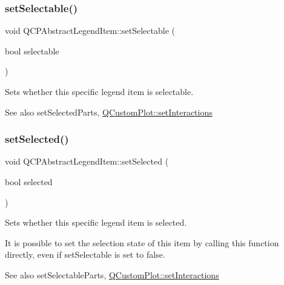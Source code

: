 \subsubsection{\texorpdfstring{set\+Selectable()}{setSelectable()}}
{\footnotesize\ttfamily void Q\+C\+P\+Abstract\+Legend\+Item\+::set\+Selectable (\begin{DoxyParamCaption}\item[{bool}]{selectable }\end{DoxyParamCaption})}

Sets whether this specific legend item is selectable.

\begin{DoxySeeAlso}{See also}
set\+Selected\+Parts, \hyperlink{class_q_custom_plot_a5ee1e2f6ae27419deca53e75907c27e5}{Q\+Custom\+Plot\+::set\+Interactions} 
\end{DoxySeeAlso}
\mbox{\label{class_q_c_p_abstract_legend_item_a6eed93b0ab99cb3eabb043fb08179c2b}} 
\subsubsection{\texorpdfstring{set\+Selected()}{setSelected()}}
{\footnotesize\ttfamily void Q\+C\+P\+Abstract\+Legend\+Item\+::set\+Selected (\begin{DoxyParamCaption}\item[{bool}]{selected }\end{DoxyParamCaption})}

Sets whether this specific legend item is selected.

It is possible to set the selection state of this item by calling this function directly, even if set\+Selectable is set to false.

\begin{DoxySeeAlso}{See also}
set\+Selectable\+Parts, \hyperlink{class_q_custom_plot_a5ee1e2f6ae27419deca53e75907c27e5}{Q\+Custom\+Plot\+::set\+Interactions} 
\end{DoxySeeAlso}
\mbox{\label{class_q_c_p_abstract_legend_item_a91db5aee48617a9d3206e61376807365}} 
